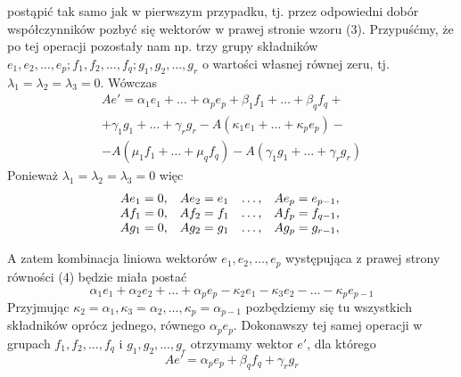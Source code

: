 \documentclass{article}
\begin{document}
postąpić tak samo jak w pierwszym przypadku, tj. przez odpowiedni dobór współczynników
pozbyć się wektorów w prawej stronie wzoru (3). Przypuśćmy, że po tej operacji pozostały
nam np. trzy grupy składników \begin{math}e_1, e_2, \ldots, e_p; f_1, f_2, \ldots, f_q; g_1, g_2, \ldots, g_r\end{math} o wartości własnej równej zeru, tj. \begin{math}\lambda_1=\lambda_2=\lambda_3=0\end{math}. Wówczas
\begin{equation}
\begin{array}{c}
Ae'=\alpha_1e_1+\ldots+\alpha_pe_p+\beta_1f_1+\ldots+\beta_qf_q+\\
+\gamma_1g_1+\ldots+\gamma_rg_r-A(\kappa_1e_1+\ldots+\kappa_pe_p)-\\
-A(\mu_1f_1+\ldots+\mu_qf_q)-A(\gamma_1g_1+\ldots+\gamma_rg_r)
\end{array}
\end{equation}
Ponieważ $\lambda_1=\lambda_2=\lambda_3=0$ więc
	\begin{displaymath}
		\begin{array}{c c c c}
		Ae_1=0, & Ae_2=e_1 & \ldots, & Ae_p=e_{p-1}, \\
		Af_1=0, & Af_2=f_1 & \ldots, & Af_p=f_{q-1}, \\
		Ag_1=0, & Ag_2=g_1 & \ldots, & Ag_p=g_{r-1},
		\end{array}\
	\end{displaymath}


A zatem kombinacja liniowa wektorów \begin{math}e_1, e_2,\ldots, e_p\end{math} występująca z prawej strony równości (4) będzie miała postać
$$\alpha_1e_1+\alpha_2e_2+\ldots+\alpha_pe_p-\kappa_2e_1-\kappa_3e_2-\ldots-\kappa_pe_{p-1}$$
Przyjmując \begin{math} \kappa_2=\alpha_1, \kappa_3=\alpha_2, \ldots, \kappa_p=\alpha_{p-1} \end{math} pozbędziemy się tu wszystkich składników oprócz jednego, równego $\alpha_pe_p$. Dokonawszy tej samej operacji w grupach \begin{math}f_1,f_2, \ldots,f_q\end{math}
i \begin{math}g_1,g_2, \ldots,g_r\end{math} otrzymamy wektor $e'$, dla którego
$$Ae'=\alpha_pe_p+\beta_qf_q+\gamma_rg_r$$
\end{document}
